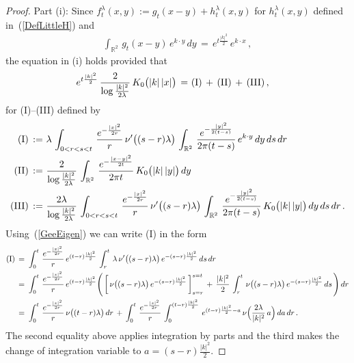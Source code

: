 \documentclass[10pt]{article}
\numberwithin{equation}{section}
\theoremstyle{definition}
\newcommand{\R}{{\mathbb R}}
\begin{document}
\begin{appendix}
\begin{proof}
\noindent Part (i): Since $f^{\lambda}_t(x,y):=g_t(x-y)+h_t^{\lambda}(x,y)$ for  $h_t^{\lambda}(x,y)$ defined in~(\ref{DefLittleH}) and
\begin{align}\label{GeeEigen}
\int_{\R^2}\,g_t(x-y)\,e^{k\cdot y}\,dy\,=\,e^{t\frac{|k|^2}{2} }\,e^{k\cdot x}\,, 
\end{align}
the equation in (i) holds provided that
\begin{align}\label{Sum3}
e^{t\frac{|k|^2}{2} }\,\frac{ 2  }{\log \frac{|k|^2}{2\lambda}   } \,K_0\big(|k|\,|x|\big) \,  =\,&\, \textup{(I)}\,+\,\textup{(II)}\,+\,\textup{(III)} \,,
\end{align}
for (I)--(III) defined by
\begin{align*}
\textup{(I)}\,:=\,&\,\lambda \,\int_{0 < r < s < t}\,\frac{ e^{-\frac{|x|^2  }{2r }  }  }{ r }\,\nu'\big( (s-r)\lambda\big) \,\int_{\R^2}\,\frac{ e^{-\frac{|y|^2  }{2(t-s) }  }  }{2\pi (t-s) }\,e^{k\cdot y}\,dy \,ds\,dr\\ \textup{(II)}\,:=\,&\,\frac{ 2 }{\log \frac{|k|^2}{2\lambda}   }\, \int_{\R^2}\,\frac{ e^{ -\frac{ |x-y|^2  }{ 2t }  }
 }{ 2\pi t}\,K_0\big(|k|\,|y|\big)\,dy \\ \textup{(III)}\,:=\,&\,\frac{2 \lambda }{\log \frac{|k|^2}{2\lambda}   }\, \int_{0 < r < s  < t}\,\frac{ e^{-\frac{|x|^2  }{2r }  }  }{ r }\,\nu'\big((s-r)\lambda\big)\, \int_{\R^2}\,\frac{ e^{-\frac{|y|^2  }{2(t-s) }  }  }{2\pi (t-s) }\,  K_0\big(|k|\,|y|\big)\,dy\,ds\,dr \,.
\end{align*}
Using~(\ref{GeeEigen}) we can write (I) in the form
\begin{align} \label{ForI}
\textup{(I)}\,=\,&\,\int_{0}^t\,\frac{ e^{-\frac{|x|^2  }{2r }  }  }{ r }\, e^{(t-r)\frac{|k|^2  }{2 }}\, \int_r^t\, \lambda\,\nu'\big((s-r)\lambda\big)\,  e^{-(s-r)\frac{|k|^2  }{2 }  } \,ds\,dr   \nonumber 
\\
\,=\,&\, \int_{0}^t\,\frac{ e^{-\frac{|x|^2  }{2r }  }  }{ r } \, e^{(t-r)\frac{|k|^2  }{2 }} \Bigg(\,  \bigg[\,\nu\big( (s-r )\lambda\big)\,  e^{-(s-r)\frac{|k|^2  }{2 }  } \,\bigg]_{s=r}^{s=t}  \,+\, \frac{|k|^2  }{2 }\,\int_r^{t} \,\nu\big((s-r)\lambda \big) \,e^{-(s-r)\frac{|k|^2  }{2 }  }  \,ds \,\Bigg)\, dr   \nonumber 
\\
\,=\,&\, \int_{0}^t\,\frac{ e^{-\frac{|x|^2  }{2r }  }  }{ r } \,\nu\big( (t-r)\lambda\big)\, dr  \,+\, \int_{0}^t\,\frac{ e^{-\frac{|x|^2  }{2r }  }  }{ r } \,\int_0^{(t-r)\frac{|k|^2}{2} }\,e^{(t-r)\frac{|k|^2  }{2 }-a }\, \nu\Big(\frac{2\lambda}{|k|^2} \,a\Big) \, da\,  dr\,. 
\end{align}
The second equality above applies integration by parts and the third makes the change of integration variable to $a=(s-r)\frac{|k|^2}{2}$.



\end{proof}
\end{appendix}
\end{document}

